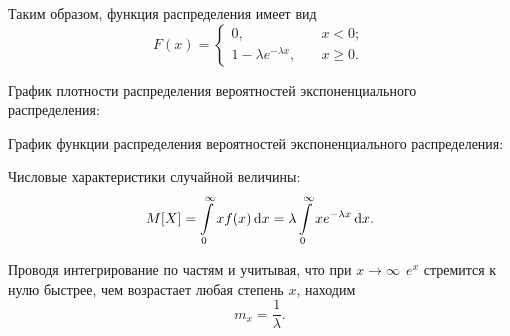 \documentclass[a4paper]{article}
\newcommand{\sgeq}{\geqslant}
\begin{document}
                    Таким образом, функция распределения имеет вид
                    \begin{equation*}
                        F(x) =
                        \begin{cases}
                            0 , \quad & x < 0 ; \\[1.0ex]
                            1 - \lambda e^{-\lambda x} , \quad & x \sgeq 0 .
                        \end{cases}
                    \end{equation*}

                    График плотности распределения вероятностей экспоненциального распределения:


                    График функции распределения вероятностей экспоненциального распределения:


                    Числовые характеристики случайной величины:
                    \begin{equation*}
                        M[X] = \int\limits_{0}^{\infty} x f(x) \dif x =
                            \lambda \int\limits_{0}^{\infty} x e^{-\lambda x} \dif x .
                    \end{equation*}

                    Проводя интегрирование по частям и учитывая, что при $x \to \infty \:\: e^x$ стремится к нулю быстрее, чем возрастает любая степень $x$, находим
                    \begin{equation*}
                        m_x = \frac{1}{\lambda} .
                    \end{equation*}
\end{document}
